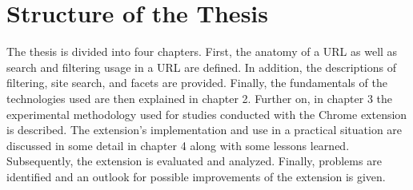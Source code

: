 \section{Structure of the Thesis}
The thesis is divided into four chapters. First, the anatomy of a URL as well as search and filtering usage in a URL are defined. In addition, the descriptions of filtering, site search, and facets are provided. Finally, the fundamentals of the technologies used are then explained in chapter 2. Further on, in chapter 3 the experimental methodology used for studies conducted with the Chrome extension is described. The extension's implementation and use in a practical situation are discussed in some detail in chapter 4 along with some lessons learned. Subsequently, the extension is evaluated and analyzed. Finally, problems are identified and an outlook for possible improvements of the extension is given.
